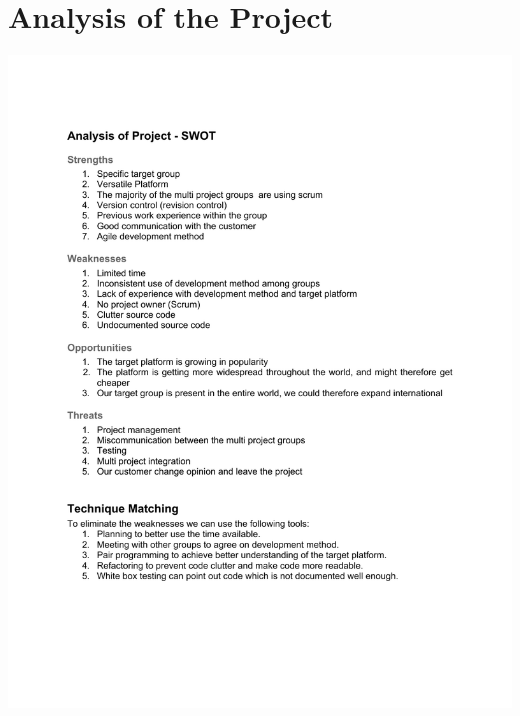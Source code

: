 \section{Analysis of the Project}
\label{sec:swot}
\begin{center}
		\includegraphics[width=\textwidth]{Appendix/SWOT.pdf}

\end{center}
